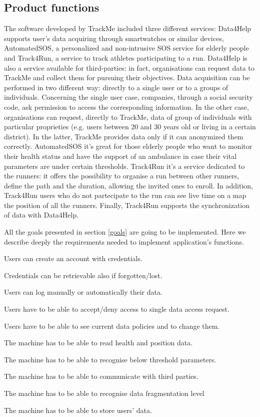 \documentclass{article}
\begin{document}
\subsection{Product functions}
The software developed by TrackMe included three different services: Data4Help supports user's data acquiring through smartwatches or similar devices, AutomatedSOS, a personalized and 
non-intrusive SOS service for elderly people and Track4Run, a service to track athletes participating to a run.
Data4Help is also a service available for third-parties: in fact, organisations can request data to TrackMe and collect them for pursuing their objectives.
Data acquisition can be performed in two different way: directly to a single user or to a groups of individuals.
Concerning the single user case, companies, through a social security code, ask permission to access the corresponding information. 
In the other case, organisations can request, directly to TrackMe, data of group of individuals with particular proprieties (e.g. users between 20 and 30 years old or living in a certain district).
In the latter, TrackMe provides data only if it can anonymized them correctly.
AutomatedSOS it’s great for those elderly people who want to monitor their health status and have the support of an ambulance in case their vital parameters are under certain thresholds.
Track4Run it’s a service dedicated to the runners: it offers the possibility to organise a run between other runners, define the path and the duration, allowing the invited ones to enroll. In addition, Track4Run users who do not partecipate to the run can see live time on a map the position of all the runners. 
Finally, Track4Run supports the synchronization of data with Data4Help.

All the goals presented in section \ref{goals} are going to be implemented. Here we describe deeply the requirements needed to implement application's functions.
	
\begin{enumerate}[label={[R\arabic*]}]
    	\item Users can create an account with credentials.
    	\item Credentials can be retrievable also if forgotten/lost.
    	\item Users can log manually or automatically their data.
    	\item Users have to be able to accept/deny access to single data access request.
    	\item Users have to be able to see current data policies and to change them.
    	\item The machine has to be able to read health and position data.
		\item The machine has to be able to recognise below threshold parameters.
		\item The machine has to be able to communicate with third parties.
		\item The machine has to be able to recognise data fragmentation level 
		\item The machine has to be able to store users’ data. 


\end{enumerate}
\end{document}
